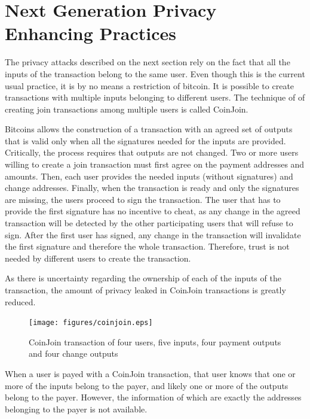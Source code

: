 \documentclass[journal]{IEEEtran}
\begin{document}
\section{Next Generation Privacy Enhancing Practices}

The privacy attacks described on the next section rely on the fact that all the inputs of the transaction belong to the same user.
Even though this is the current usual practice, it is by no means a restriction of bitcoin.
It is possible to create transactions with multiple inputs belonging to different users.
The technique of of creating join transactions among multiple users is called CoinJoin.

Bitcoins allows the construction of a transaction with an agreed set of outputs that is valid only when all the signatures needed for the inputs are provided.
Critically, the process requires that outputs are not changed.
Two or more users willing to create a join transaction must first agree on the payment addresses and amounts.
Then, each user provides the needed inputs (without signatures) and change addresses.
Finally, when the transaction is ready and only the signatures are missing, the users proceed to sign the transaction.
The user that has to provide the first signature has no incentive to cheat, as any change in the agreed transaction will be detected by the other participating users that will refuse to sign.
After the first user has signed, any change in the transaction will invalidate the first signature and therefore the whole transaction.
Therefore, trust is not needed by different users to create the transaction.

As there is uncertainty regarding the ownership of each of the inputs of the transaction, the amount of privacy leaked in CoinJoin transactions is greatly reduced.


\begin{figure}[!t]
\centering
\texttt{[image: figures/coinjoin.eps]}
\caption{CoinJoin transaction of four users, five inputs, four payment outputs and four change outputs}
\label{fig:address-reuse}
\end{figure}

When a user is payed with a CoinJoin transaction, that user knows that one or more of the inputs belong to the payer, and likely one or more of the outputs belong to the payer.
However, the information of which are exactly the addresses belonging to the payer is not available.

\end{document}

